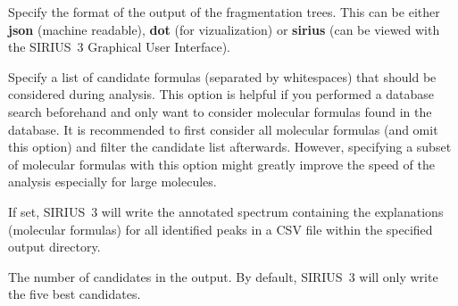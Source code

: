 \documentclass[letterpaper,10pt,openany,oneside]{sphinxmanual}
\begin{document}
\begin{fulllineitems}
\label{commandline:cmdoption-O}
Specify the format of the output of the fragmentation trees. This can be either \textbf{json} (machine readable), \textbf{dot} (for vizualization) or \textbf{sirius} (can be viewed with the SIRIUS~3 Graphical User Interface).

\end{fulllineitems}


\begin{fulllineitems}
\label{commandline:cmdoption-f}
Specify a list of candidate formulas (separated by whitespaces) that should be considered during analysis. This option is helpful if you performed a database search beforehand and only want to consider molecular formulas found in the database. It is recommended to first consider all molecular formulas (and omit this option) and filter the candidate list afterwards. However, specifying a subset of molecular formulas with this option might greatly improve the speed of the analysis especially for large molecules.

\end{fulllineitems}


\begin{fulllineitems}
\label{commandline:cmdoption-a}
If set, SIRIUS~3 will write the annotated spectrum containing the explanations (molecular formulas) for all identified peaks in a CSV file within the specified output directory.

\end{fulllineitems}


\begin{fulllineitems}
\label{commandline:cmdoption-c}
The number of candidates in the output. By default, SIRIUS~3 will only write the five best candidates.

\end{fulllineitems}
\end{document}
